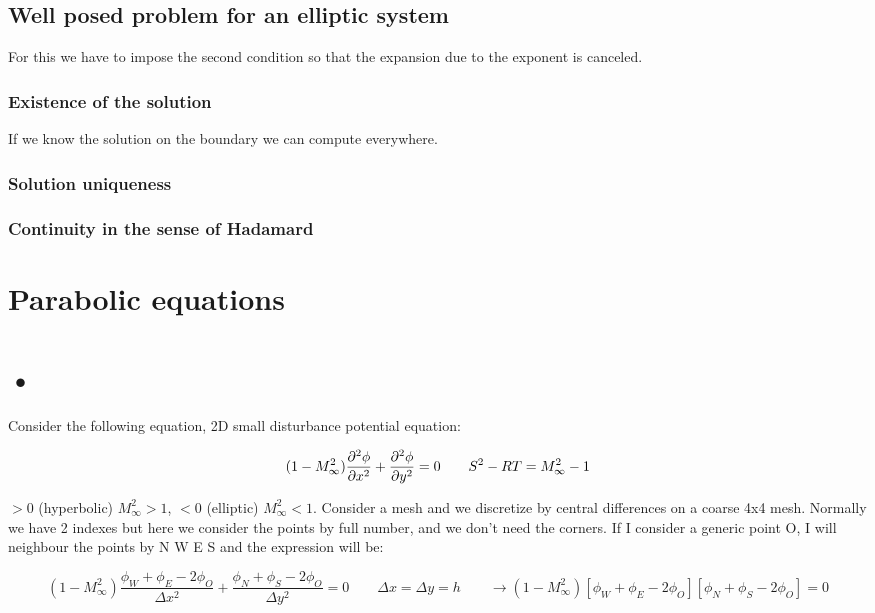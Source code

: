 \subsection{Well posed problem for an elliptic system}
For this we have to impose the second condition so that the expansion due to the exponent is canceled. 

\subsubsection{Existence of the solution}
If we know the solution on the boundary we can compute everywhere. 

\subsubsection{Solution uniqueness}
\subsubsection{Continuity in the sense of Hadamard}

\section{Parabolic equations}

\section{•}
Consider the following equation, 2D small disturbance potential equation: 

\begin{equation}
(1-M^2_\infty) \frac{\partial^2 \phi}{\partial x^2} + \frac{\partial^2\phi}{\partial y^2} = 0 \qquad S^2 - RT = M^2_\infty -1 
\end{equation}

$>0$ (hyperbolic) $M_\infty^2>1$, $<0$ (elliptic) $M_\infty^2<1$. Consider a mesh and we discretize by central differences on a coarse 4x4 mesh. Normally we have 2 indexes but here we consider the points by full number, and we don't need the corners. If I consider a generic point O, I will neighbour the points by N W E S and the expression will be: 

\begin{equation}
(1 - M_\infty^2) \frac{\phi _W + \phi _E - 2\phi _O}{\Delta x^2} + \frac{\phi _N + \phi _S - 2\phi _O}{\Delta y^2} = 0 \qquad \Delta x = \Delta y = h \qquad \rightarrow (1-M_\infty ^2) [\phi _W + \phi _E - 2\phi _O][\phi _N + \phi _S - 2\phi _O] = 0
\end{equation}

